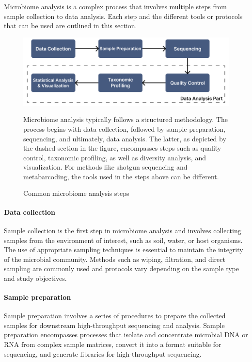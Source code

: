 
 
        Microbiome analysis is a complex process that involves multiple steps from sample collection to data analysis. Each step and the different tools or protocols that can be used are outlined in this section.

        \begin{figure}[h]
            \centering
            \includegraphics[scale=0.5]{images/state_of_the_art/microbiome_analysis.png}
            \caption{Common microbiome analysis steps}
            \small Microbiome analysis typically follows a structured methodology. The process begins with data collection, followed by sample preparation, sequencing, and ultimately, data analysis. The latter, as depicted by the dashed section in the figure, encompasses steps such as quality control, taxonomic profiling, as well as diversity analysis, and visualization. For methods like shotgun sequencing and metabarcoding, the tools used in the steps above can be different.
            \label{fig:state_of_art:microbiome_analysis}
        \end{figure}

        \paragraph*{Data collection}
        Sample collection is the first step in microbiome analysis and involves collecting samples from the environment of interest, such as soil, water, or host organisms. The use of appropriate sampling techniques is essential to maintain the integrity of the microbial community. Methods such as wiping, filtration, and direct sampling are commonly used and protocols vary depending on the sample type and study objectives.


        \paragraph*{Sample preparation}
        Sample preparation involves a series of procedures to prepare the collected samples for downstream high-throughput sequencing and analysis. Sample preparation encompasses processes that isolate and concentrate microbial DNA or RNA from complex sample matrices, convert it into a format suitable for sequencing, and generate libraries for high-throughput sequencing.

